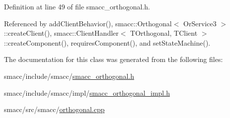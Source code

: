 Definition at line 49 of file smacc\+\_\+orthogonal.\+h.



Referenced by add\+Client\+Behavior(), smacc\+::\+Orthogonal$<$ Or\+Service3 $>$\+::create\+Client(), smacc\+::\+Client\+Handler$<$ T\+Orthogonal, T\+Client $>$\+::create\+Component(), requires\+Component(), and set\+State\+Machine().



The documentation for this class was generated from the following files\+:\begin{DoxyCompactItemize}
\item 
smacc/include/smacc/\hyperlink{smacc__orthogonal_8h}{smacc\+\_\+orthogonal.\+h}\item 
smacc/include/smacc/impl/\hyperlink{smacc__orthogonal__impl_8h}{smacc\+\_\+orthogonal\+\_\+impl.\+h}\item 
smacc/src/smacc/\hyperlink{orthogonal_8cpp}{orthogonal.\+cpp}\end{DoxyCompactItemize}
